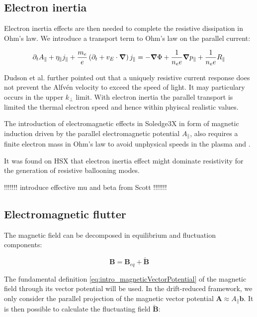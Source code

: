 \subsection{Electron inertia}

Electron inertia effects are then needed to complete the resistive dissipation in Ohm's law. We introduce a transport term to Ohm's law on the parallel current: 

\begin{equation}
	\label{eq:electromagneticElectronInertiaOhmsLaw}
	\partial_t A_\parallel + \eta_\parallel j_\parallel + \frac{m_e}{e}\left(\partial_t + v_E\cdot\grad\right)j_\parallel = -\grad\Phi + \frac{1}{n_ee}\grad p_\parallel + \frac{1}{n_ee}R_\parallel
\end{equation}

Dudson et al.\cite{Dudson2021} further pointed out that a uniquely resistive current response does not prevent the Alfvén velocity to exceed the speed of light. It may particulary occurs in the upper $k_\perp$ limit. With electron inertia the parallel transport is limited the thermal electron speed and hence within phyiscal realistic values.

The introduction of electromagnetic effects in Soledge3X in form of magnetic induction driven by the parallel electromagnetic potential $A_\parallel$, also requires a finite electron mass in Ohm's law to avoid unphysical speeds in the plasma and .


It was found on HSX that electron inertia effect might dominate resistivity for the generation of resistive ballooning modes\cite{rafiq2009unified}.

!!!!!!!
introduce effective mu and beta from Scott
!!!!!!!


\subsection{Electromagnetic flutter}

The magnetic field can be decomposed in equilibrium and fluctuation components:

\begin{equation}
	\mathbf{B} = \mathbf{B}_{eq} + \mathbf{\tilde{B}}
\end{equation}

The fundamental definition \ref{eq:intro_magneticVectorPotential} of the magnetic field through its vector potential will be used. In the drift-reduced framework, we only consider the parallel projection of the magnetic vector potential $\mathbf{A} \approx A_\parallel\mathbf{b}$. It is then possible to calculate the fluctuating field $\mathbf{\tilde{B}}$:

